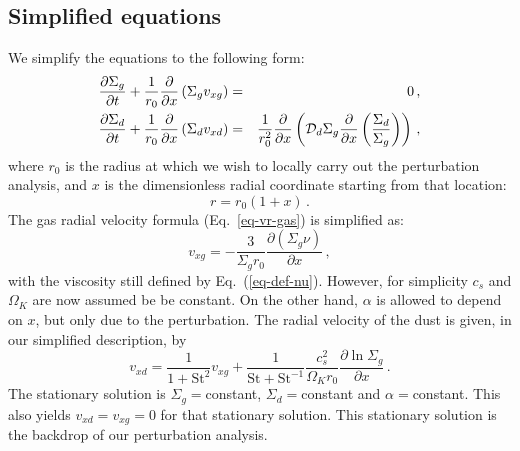 \documentclass{aa}
\def\comma{\,,}
\def\fullstop{\,.}
\begin{document}
\subsection{Simplified equations}
We simplify the equations to the following form:
\begin{eqnarray}
\frac{\partial \Sigma_{g}}{\partial t} +
\frac{1}{r_0}\frac{\partial}{\partial x}
  \left(\Sigma_g v_{xg}\right) &=& 0\comma\label{eq-simpl-gas-continuity}\\
\frac{\partial \Sigma_{d}}{\partial t} +
\frac{1}{r_0}\frac{\partial}{\partial x}
  \left(\Sigma_d v_{xd}\right) &=&
  \frac{1}{r_0^2}
  \frac{\partial}{\partial x}
  \left({\cal D}_d\Sigma_g\frac{\partial}{\partial x}
  \left(\frac{\Sigma_d}{\Sigma_g}\right)\right)\comma\label{eq-simpl-dust-continuity}
\end{eqnarray}
where $r_0$ is the radius at which we wish to locally carry out the perturbation
analysis, and $x$ is the dimensionless radial coordinate starting from that
location:
\begin{equation}
r = r_0 (1+x)\fullstop
\end{equation}
The gas radial velocity formula (Eq.~\ref{eq-vr-gas}) is simplified as:
\begin{equation}\label{eq-simpl-vr-gas}
  v_{xg} = - \frac{3}{\Sigma_gr_0}\frac{\partial(\Sigma_g\nu)}{\partial x}\comma
\end{equation}
with the viscosity still defined by Eq.~(\ref{eq-def-nu}). However, for
simplicity $c_s$ and $\Omega_K$ are now assumed be be constant. On the
other hand, $\alpha$ is allowed to depend on $x$, but only due to the
perturbation. The radial velocity of the dust is given, in our simplified
description, by
\begin{equation}\label{eq-simpl-vdust-1}
  v_{xd} = \frac{1}{1+\mathrm{St}^2} v_{xg}
  + \frac{1}{\mathrm{St}+\mathrm{St}^{-1}}\frac{c_s^2}{\Omega_Kr_0}
  \frac{\partial\ln \Sigma_g}{\partial x}\fullstop
\end{equation}
The stationary solution is $\Sigma_g=$constant, $\Sigma_d=$constant and
$\alpha=$constant. This also yields $v_{xd}=v_{xg}=0$ for that stationary
solution. This stationary solution is the backdrop of our perturbation
analysis. 
\end{document}
